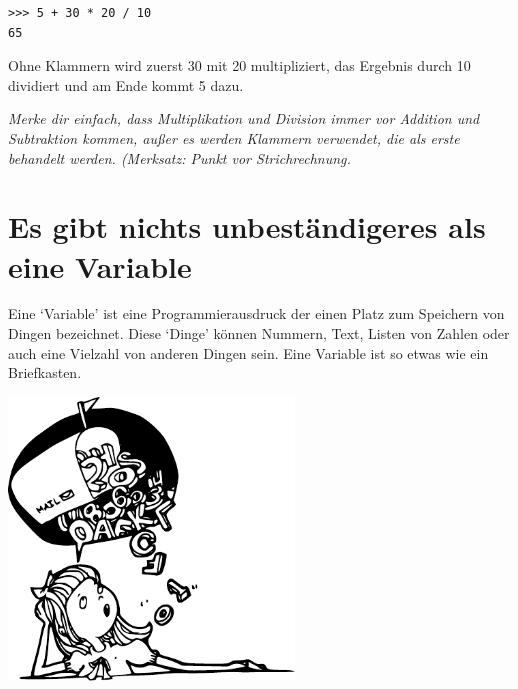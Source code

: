 \begin{Verbatim}[frame=single]
>>> 5 + 30 * 20 / 10
65
\end{Verbatim}

Ohne Klammern wird zuerst 30 mit 20 multipliziert, das Ergebnis durch 10 dividiert und am Ende kommt 5 dazu.

\emph{Merke dir einfach, dass Multiplikation und Division immer vor Addition und Subtraktion kommen, außer es werden Klammern verwendet, die als erste behandelt werden. (Merksatz: Punkt vor Strichrechnung.}

\section{Es gibt nichts unbeständigeres als eine Variable}

Eine `Variable' ist eine Programmierausdruck der einen Platz zum Speichern von Dingen bezeichnet. Diese `Dinge' können Nummern, Text, Listen von Zahlen oder auch eine Vielzahl von anderen Dingen sein. Eine Variable ist so etwas wie ein Briefkasten.

\begin{center}
\includegraphics*[width=76mm]{images/girlbubble}
\end{center}

